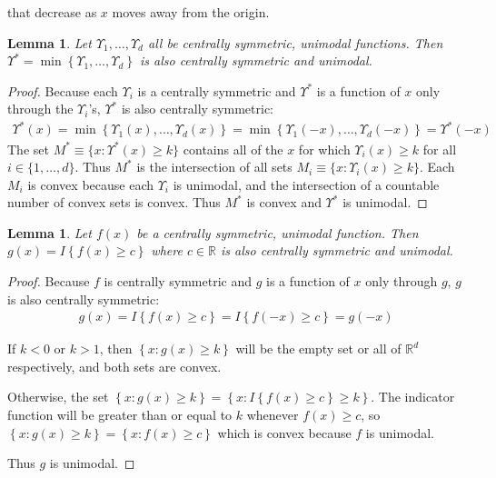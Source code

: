 \documentclass{article}
\newtheorem{lemma}[theorem]{Lemma}
\newcommand{\gi}{\Upsilon}
\begin{document}
that decrease as $x$ moves away from the origin.   

\begin{lemma}
	\label{lemma:min_cent_sym_unm}
	Let $\gi_1, \dots, \gi_d$ all be centrally symmetric, unimodal functions.  Then $\gi^* = \min\left\{\gi_1, \dots, \gi_d\right\}$ is also centrally symmetric and unimodal.
\end{lemma}
\begin{proof}
Because each $\gi_i$ is a centrally symmetric and $\gi^*$ is a function of $x$ only through the $\gi_i$'s, $\gi^*$ is also centrally symmetric:
	\begin{align*}
	\gi^*(x) = \min\left\{\gi_1(x), \dots, \gi_d(x)\right\} = \min\left\{\gi_1(-x), \dots, \gi_d(-x)\right\} = \gi^*(-x)
	\end{align*}
The set $M^* \equiv \{x : \gi^*(x) \geq k\}$ contains all of the $x$ for which $\gi_i(x) \geq k$ for all $i \in \{1, \dots, d\}$.  Thus $M^*$ is the intersection of all sets $M_i \equiv \{x : \gi_i(x) \geq k\}$.  Each $M_i$ is convex because each $\gi_i$ is unimodal, and the intersection of a countable number of convex sets is convex.  Thus $M^*$ is convex and $\gi^*$ is unimodal.
\end{proof}

\begin{lemma}
	\label{lemma:indct_cent_sym_unm}
	Let $f(x)$ be a centrally symmetric, unimodal function.  Then $g(x) = I\left\{f(x) \geq c\right\}$ where $c \in \mathbb{R}$ is also centrally symmetric and unimodal. 
\end{lemma}
\begin{proof}
Because $f$ is centrally symmetric and $g$ is a function of $x$ only through $g$, $g$ is also centrally symmetric:
	\begin{align*}
	g(x) = I\left\{f(x) \geq c\right\} = I\left\{f(-x) \geq c\right\} = g(-x)
	\end{align*}

	If $k < 0$ or $k > 1$, then $\left\{x : g(x) \geq k\right\}$ will be the empty set or all of $\mathbb{R}^d$ respectively, and both sets are convex.  
	
	Otherwise, the set $\left\{x : g(x) \geq k\right\} = \left\{x : I\left\{f(x) \geq c\right\} \geq k\right\}$. The indicator function will be greater than or equal to $k$ whenever $f(x) \geq c$, so $\left\{x : g(x) \geq k\right\} =\left\{x : f(x) \geq c\right\}$
	which is convex because $f$ is unimodal.

	Thus $g$ is unimodal.
\end{proof}
\end{document}
